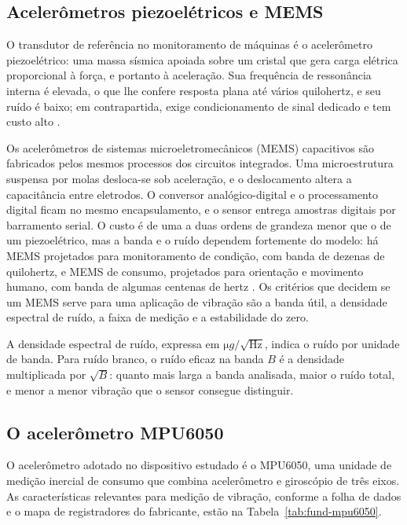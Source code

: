\subsection{Acelerômetros piezoelétricos e MEMS}

O transdutor de referência no monitoramento de máquinas é o acelerômetro piezoelétrico:
uma massa sísmica apoiada sobre um cristal que gera carga elétrica proporcional à força, e
portanto à aceleração. Sua frequência de ressonância interna é elevada, o que lhe confere
resposta plana até vários quilohertz, e seu ruído é baixo; em contrapartida, exige
condicionamento de sinal dedicado e tem custo alto \cite{albarbar2008}.

Os acelerômetros de sistemas microeletromecânicos (MEMS) capacitivos são fabricados pelos
mesmos processos dos circuitos integrados. Uma microestrutura suspensa por molas
desloca-se sob aceleração, e o deslocamento altera a capacitância entre eletrodos. O
conversor analógico-digital e o processamento digital ficam no mesmo encapsulamento, e o
sensor entrega amostras digitais por barramento serial. O custo é de uma a duas ordens de
grandeza menor que o de um piezoelétrico, mas a banda e o ruído dependem fortemente do
modelo: há MEMS projetados para monitoramento de condição, com banda de dezenas de
quilohertz, e MEMS de consumo, projetados para orientação e movimento humano, com banda de
algumas centenas de hertz \cite{albarbar2008,fidali2024}. Os critérios que decidem se um
MEMS serve para uma aplicação de vibração são a banda útil, a densidade espectral de ruído,
a faixa de medição e a estabilidade do zero.

A densidade espectral de ruído, expressa em $\si{\micro g}/\sqrt{\si{\hertz}}$, indica o
ruído por unidade de banda. Para ruído branco, o ruído eficaz na banda $B$ é a densidade
multiplicada por $\sqrt{B}$: quanto mais larga a banda analisada, maior o ruído total, e
menor a menor vibração que o sensor consegue distinguir.

\subsection{O acelerômetro MPU6050}
\label{sec:fund-mpu6050}

O acelerômetro adotado no dispositivo estudado é o MPU6050, uma unidade de medição inercial
de consumo que combina acelerômetro e giroscópio de três eixos. As características
relevantes para medição de vibração, conforme a folha de dados e o mapa de registradores do
fabricante, estão na Tabela~\ref{tab:fund-mpu6050}.

